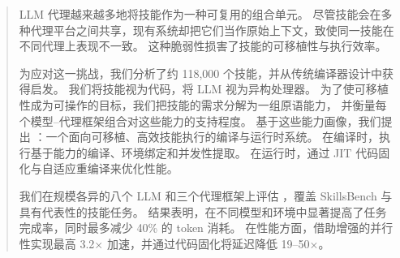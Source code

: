 \begin{abstract}
LLM 代理越来越多地将技能作为一种可复用的组合单元。
尽管技能会在多种代理平台之间共享，现有系统却把它们当作原始上下文，致使同一技能在不同代理上表现不一致。
这种脆弱性损害了技能的可移植性与执行效率。

为应对这一挑战，我们分析了约 118,000 个技能，并从传统编译器设计中获得启发。
我们将技能视为代码，将 LLM 视为异构处理器。
为了使可移植性成为可操作的目标，我们把技能的需求分解为一组原语能力，
并衡量每个模型--代理框架组合对这些能力的支持程度。
基于这些能力画像，我们提出 \sys：一个面向可移植、高效技能执行的编译与运行时系统。
在编译时，\sys 执行基于能力的编译、环境绑定和并发性提取。
在运行时，\sys 通过 JIT 代码固化与自适应重编译来优化性能。

我们在规模各异的八个 LLM 和三个代理框架上评估 \sys，覆盖 SkillsBench 与具有代表性的技能任务。
结果表明，\sys 在不同模型和环境中显著提高了任务完成率，同时最多减少 40\% 的 token 消耗。
在性能方面，\sys 借助增强的并行性实现最高 3.2$\times$ 加速，并通过代码固化将延迟降低 19--50$\times$。
\end{abstract}
